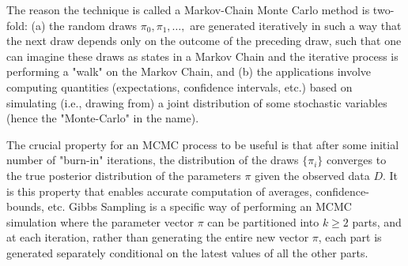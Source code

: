 \documentclass[11pt,a4paper]{article}
\theoremstyle{definition}
\theoremstyle{remark}
\theoremstyle{definition}
\theoremstyle{definition}
\theoremstyle{definition}
\theoremstyle{definition}
\theoremstyle{definition}
\theoremstyle{definition}
\begin{document}
The reason the technique is called a Markov-Chain Monte Carlo method is two-fold: (a) the random draws $\pi_0, \pi_1, \ldots,$ are generated iteratively in such a way that the next draw depends only on the outcome of the preceding draw, such that one can imagine these draws as states in a Markov Chain and the iterative process is performing a "walk" on the Markov Chain, and (b) the applications involve computing quantities (expectations, confidence intervals, etc.) based on simulating (i.e., drawing from) a joint distribution of some stochastic variables (hence the "Monte-Carlo" in the name). 

The crucial property for an MCMC process to be useful is that after some initial number of "burn-in" iterations, the distribution of the draws $\{\pi_i\}$ converges to the true posterior distribution of the parameters $\pi$ given the observed data $D$. It is this property that enables accurate computation of averages, confidence-bounds, etc. Gibbs Sampling is a specific way of performing an MCMC simulation where the parameter vector $\pi$ can be partitioned into $k \geq 2$ parts, and at each iteration, rather than generating the entire new vector $\pi$, each part is generated separately conditional on the latest values of all the other parts.
\end{document}
